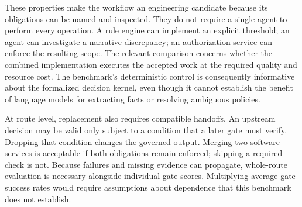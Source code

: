 These properties make the workflow an engineering candidate because its obligations can be
named and inspected. They do not require a single agent to perform every operation. A rule
engine can implement an explicit threshold; an agent can investigate a narrative discrepancy;
an authorization service can enforce the resulting scope. The relevant comparison concerns
whether the combined implementation executes the accepted work at the required quality and
resource cost. The benchmark's deterministic control is consequently informative about the
formalized decision kernel, even though it cannot establish the benefit of language models
for extracting facts or resolving ambiguous policies.

At route level, replacement also requires compatible handoffs. An upstream decision may be
valid only subject to a condition that a later gate must verify. Dropping that condition changes
the governed output. Merging two software services is acceptable if both obligations remain
enforced; skipping a required check is not. Because failures and missing evidence can propagate,
whole-route evaluation is necessary alongside individual gate scores. Multiplying average
gate success rates would require assumptions about dependence that this benchmark does not
establish.
